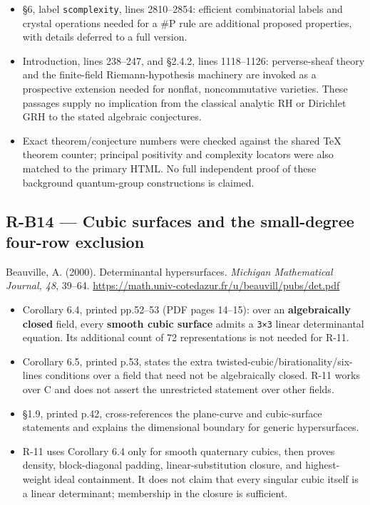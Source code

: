 \documentclass[11pt,a4paper]{article}
\providecommand{\tightlist}{\setlength{\itemsep}{0pt}\setlength{\parskip}{0pt}}
\theoremstyle{definition}\newtheorem{definition}{Definition}
\begin{document}
\begin{itemize}
  \texttt{cposkroneckerright}; §3.5.1, Conjectures 3.5--3.6, labels
  \texttt{cnonstdposright}, \texttt{cnonstdposright1}; §3.5.2,
  Conjecture 3.7, label \texttt{coppquasicell}.
\item
  §6, label \texttt{scomplexity}, lines 2810--2854: efficient
  combinatorial labels and crystal operations needed for a \#P rule are
  additional proposed properties, with details deferred to a full
  version.
\item
  Introduction, lines 238--247, and §2.4.2, lines 1118--1126:
  perverse-sheaf theory and the finite-field Riemann-hypothesis
  machinery are invoked as a prospective extension needed for nonflat,
  noncommutative varieties. These passages supply no implication from
  the classical analytic RH or Dirichlet GRH to the stated algebraic
  conjectures.
\item
  Exact theorem/conjecture numbers were checked against the shared TeX
  theorem counter; principal positivity and complexity locators were
  also matched to the primary HTML. No full independent proof of these
  background quantum-group constructions is claimed.
\end{itemize}

\subsection{R-B14 --- Cubic surfaces and the small-degree four-row
exclusion}\label{r-b14--cubic-surfaces-and-the-small-degree-four-row-exclusion}

Beauville, A. (2000). Determinantal hypersurfaces. \emph{Michigan
Mathematical Journal, 48}, 39--64.
\url{https://math.univ-cotedazur.fr/u/beauvill/pubs/det.pdf}

\begin{itemize}
\tightlist
\item
  Corollary 6.4, printed pp.52--53 (PDF pages 14--15): over an
  \textbf{algebraically closed} field, every \textbf{smooth cubic
  surface} admits a \texttt{3×3} linear determinantal equation. Its
  additional count of 72 representations is not needed for R-11.
\item
  Corollary 6.5, printed p.53, states the extra
  twisted-cubic/birationality/six-lines conditions over a field that
  need not be algebraically closed. R-11 works over C and does not
  assert the unrestricted statement over other fields.
\item
  §1.9, printed p.42, cross-references the plane-curve and cubic-surface
  statements and explains the dimensional boundary for generic
  hypersurfaces.
\item
  R-11 uses Corollary 6.4 only for smooth quaternary cubics, then proves
  density, block-diagonal padding, linear-substitution closure, and
  highest-weight ideal containment. It does not claim that every
  singular cubic itself is a linear determinant; membership in the
  closure is sufficient.
\end{itemize}
\end{document}
